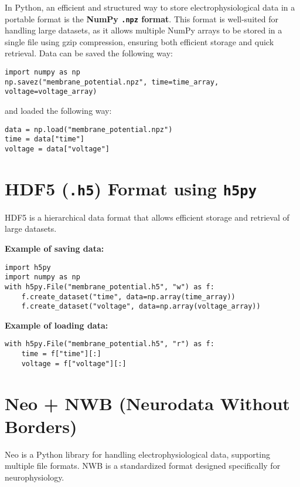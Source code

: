 \documentclass[a4paper,9pt]{extarticle}
\begin{document}
\begin{multicols}{2}

In Python, an efficient and structured way to store electrophysiological data in a portable format is the \textbf{NumPy \texttt{.npz} format}. This format is well-suited for handling large datasets, as it allows multiple NumPy arrays to be stored in a single file using gzip compression, ensuring both efficient storage and quick retrieval. Data can be saved the following way:
\begin{lstlisting}
import numpy as np
np.savez("membrane_potential.npz", time=time_array, voltage=voltage_array)
\end{lstlisting}
and loaded the following way:
\begin{lstlisting}
data = np.load("membrane_potential.npz")
time = data["time"]
voltage = data["voltage"]
\end{lstlisting}

\section*{HDF5 (\texttt{.h5}) Format using \texttt{h5py}}

HDF5 is a hierarchical data format that allows efficient storage and retrieval of large datasets.

\textbf{Example of saving data:}

\begin{lstlisting}
import h5py
import numpy as np
with h5py.File("membrane_potential.h5", "w") as f:
    f.create_dataset("time", data=np.array(time_array))
    f.create_dataset("voltage", data=np.array(voltage_array))
\end{lstlisting}

\textbf{Example of loading data:}

\begin{lstlisting}
with h5py.File("membrane_potential.h5", "r") as f:
    time = f["time"][:]
    voltage = f["voltage"][:]
\end{lstlisting}

\section*{Neo + NWB (Neurodata Without Borders)}

Neo is a Python library for handling electrophysiological data, supporting multiple file formats. NWB is a standardized format designed specifically for neurophysiology.


\end{multicols}
\end{document}
